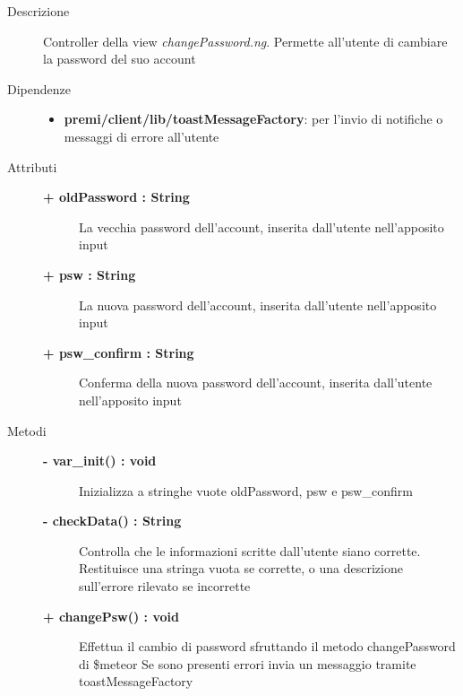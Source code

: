 \begin{description}
\item[Descrizione] \hfill
	Controller della view \textit{changePassword.ng}. Permette all'utente di cambiare la password del suo account
	
	
	
\item[Dipendenze] \hfill
	\begin{itemize}
		\item \textbf{premi/client/lib/toastMessageFactory}: per l'invio di notifiche o messaggi di errore all'utente
	\end{itemize}
	
	
\item[Attributi] \hfill
	\begin{description}
		\item[\textbf{+ oldPassword : String			}] \hfill
			La vecchia password dell'account, inserita dall'utente nell'apposito input
		\item[\textbf{+ psw : String			}] \hfill
			La nuova password dell'account, inserita dall'utente nell'apposito input
		\item[\textbf{+ psw\_confirm : String			}] \hfill
			Conferma della nuova password dell'account, inserita dall'utente nell'apposito input
	\end{description}
	
	
\item[Metodi] \hfill

	\begin{description}
		\item[\textbf{\color{blue}- var\_init() : void			}] \hfill
			Inizializza a stringhe vuote oldPassword, psw e psw\_confirm
	\end{description}
	
	\begin{description}
		\item[\textbf{\color{blue}- checkData() : String			}] \hfill
			Controlla che le informazioni scritte dall'utente siano corrette. Restituisce una stringa vuota se corrette, o una descrizione sull'errore rilevato se incorrette
	\end{description}
	
	\begin{description}
		\item[\textbf{\color{blue}+ changePsw() : void			}] \hfill
			Effettua il cambio di password sfruttando il metodo changePassword di \$meteor
			Se sono presenti errori invia un messaggio tramite toastMessageFactory
	\end{description}

\end{description}







